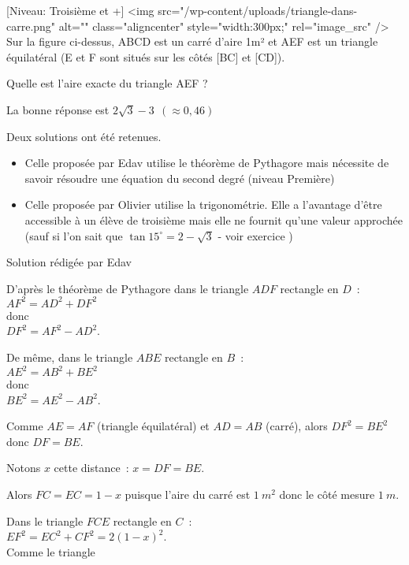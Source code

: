 
%
[Niveau: Troisième et +]
<img src="/wp-content/uploads/triangle-dans-carre.png" alt="" class="aligncenter" style="width:300px;" rel="image_src" />
Sur la figure ci-dessus, ABCD est un carré d'aire 1m² et AEF est un triangle équilatéral (E et F sont situés sur les côtés [BC] et [CD]).
\par
Quelle est l'aire exacte du triangle AEF ?
\begin{solution}
     \begin{note}
          La bonne réponse est $2 \sqrt{3}-3 \ \ ( \approx 0,46) $
          \par
          Deux solutions ont été retenues.
          \begin{itemize}
               \item
               Celle proposée par Edav utilise le théorème de Pythagore mais nécessite de savoir résoudre une équation du second degré (niveau Première)
               \item
               Celle proposée par Olivier utilise la trigonométrie. Elle a l'avantage d'être accessible à un élève de troisième mais elle ne fournit qu'une valeur approchée (sauf si l'on sait que $\tan 15^{\circ}=  2-\sqrt{3}$ - voir exercice )
          \end{itemize}
     \end{note}
     Solution rédigée par Edav
\begin{note}
  D'après le théorème de Pythagore dans le triangle $ ADF $ rectangle en $ D $~:
\\
$ AF^2 = AD^2 + DF^2 $
\\
donc
\\
$ DF^2 = AF^2 - AD^2 $.
\par
De même, dans le triangle $ ABE $ rectangle en $ B $~:
\\
$ AE^2 = AB^2 + BE^2 $
\\
donc
\\
$ BE^2 = AE^2 - AB^2 $.
\par
Comme $ AE = AF $ (triangle équilatéral) et $ AD = AB $ (carré), alors $ DF^2 = BE^2 $ donc $  DF = BE $.
\par
Notons $ x $ cette distance~: $ x = DF = BE $.
\par
Alors $ FC = EC = 1 - x $ puisque l'aire du carré est $ 1\ m^2 $ donc le côté mesure $ 1\ m. $
\par
Dans le triangle $ FCE $ rectangle en $ C$~:
\\
$ EF^2 = EC^2 + CF^2 = 2(1-x)^2 $.
\\
Comme le triangle $  $
\end{note}
\medskip
     \par



\end{solution}
